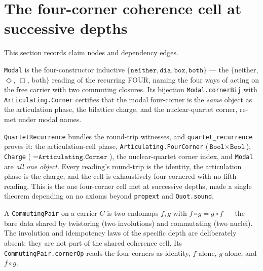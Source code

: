 \section{The four-corner coherence cell at successive depths}

This section records claim nodes and dependency edges.

\begin{theorem}\label{thm:modal}\leanok{}
\texttt{Modal} is the four-constructor inductive $\{\texttt{neither}, \texttt{dia}, \texttt{box}, \texttt{both}\}$ --- the $\{$neither, $\Diamond$, $\Box$, both$\}$ reading of the recurring FOUR, naming the four ways of acting on the free carrier with two commuting closures. Its bijection \texttt{Modal.cornerBij} with \texttt{Articulating.Corner} certifies that the modal four-corner is the \emph{same} object as the articulation phase, the bilattice charge, and the nuclear-quartet corner, re-met under modal names.
\end{theorem}
\begin{theorem}\label{thm:quartet-recurrence}\leanok{}
\texttt{QuartetRecurrence} bundles the round-trip witnesses, and \texttt{quartet\_recurrence} proves it: the articulation-cell phase, \texttt{Articulating.FourCorner} ($\texttt{Bool} \times \texttt{Bool}$), \texttt{Charge} ($=\texttt{Articulating.Corner}$), the nuclear-quartet corner index, and \texttt{Modal} are \emph{all one object}. Every reading's round-trip is the identity, the articulation phase is the charge, and the cell is exhaustively four-cornered with no fifth reading. This is the one four-corner cell met at successive depths, made a single theorem depending on no axioms beyond \texttt{propext} and \texttt{Quot.sound}.
\end{theorem}
\begin{proposition}\label{thm:commuting-pair}\leanok{}
A \texttt{CommutingPair} on a carrier $C$ is two endomaps $f, g$ with $f \circ g = g \circ f$ --- the bare data shared by twistoring (two involutions) and commutating (two nuclei). The involution and idempotency laws of the specific depth are deliberately absent: they are not part of the shared coherence cell. Its \texttt{CommutingPair.cornerOp} reads the four corners as identity, $f$ alone, $g$ alone, and $f \circ g$.
\end{proposition}
